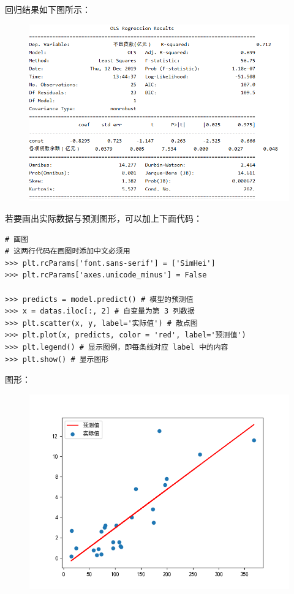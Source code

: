 回归结果如下图所示：

\begin{figure}[ht]
  \centering
  \includegraphics[scale=0.8]{figure/linearRegressionResult.png}
\end{figure}

若要画出实际数据与预测图形，可以加上下面代码：

\begin{lstlisting}[Language=Python]
# 画图
# 这两行代码在画图时添加中文必须用
>>> plt.rcParams['font.sans-serif'] = ['SimHei']
>>> plt.rcParams['axes.unicode_minus'] = False

>>> predicts = model.predict() # 模型的预测值
>>> x = datas.iloc[:, 2] # 自变量为第 3 列数据
>>> plt.scatter(x, y, label='实际值') # 散点图
>>> plt.plot(x, predicts, color = 'red', label='预测值')
>>> plt.legend() # 显示图例，即每条线对应 label 中的内容
>>> plt.show() # 显示图形
\end{lstlisting}

图形：

\begin{figure}[ht]
  \centering
  \includegraphics[scale=0.5]{figure/lineRegression1.png}
\end{figure}

